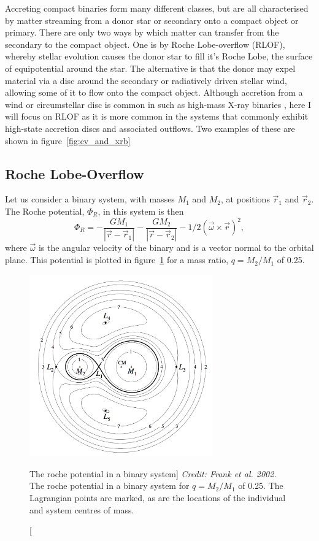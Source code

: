 Accreting compact binaries form many different classes, 
but are all characterised by matter streaming from a donor star or secondary
onto a compact object or primary.
There are only two ways by which matter can transfer 
from the secondary to the compact object. One is by Roche Lobe-overflow (RLOF),
whereby stellar evolution causes the donor star to fill it's Roche Lobe, the surface
of equipotential around the star. The alternative is that the donor may expel
material via a disc around the secondary or radiatively driven stellar wind, 
allowing some of it to flow onto the compact object. 
Although accretion from a wind or circumstellar disc is common in 
such as high-mass X-ray binaries \citep[HMXBs; e.g.][]{bartlett2013}, here I will focus on 
RLOF as it is more common in the systems that commonly exhibit high-state accretion discs
and associated outflows. Two examples of these are shown in figure~\ref{fig:cv_and_xrb}


\subsection{Roche Lobe-Overflow}

Let us consider a binary system, with masses $M_1$ and $M_2$, at positions
$\vec{r}_1$ and $\vec{r}_2$. The Roche potential, $\Phi_R$, in this system 
is then
\begin{equation}
\Phi_R = - \frac{GM_1}{| \vec{r} - \vec{r}_1 |} - 
\frac{GM_2}{| \vec{r} - \vec{r}_2 |} - 1/2 (\vec{\omega} \times
 \vec{r})^2,
\label{eq:roche}
\end{equation} 
where $\vec{\omega}$ is the angular velocity of the binary and is a vector normal to
the orbital plane. This potential is plotted in figure~\ref{fig:roche} for a mass ratio, 
$q = M_2 / M_1$ of 0.25.

\begin{figure}
\centering
\includegraphics[width=0.7\textwidth]{figures/01-intro/roche_potential.png}
\caption
[The roche potential in a binary system]
{
{\sl Credit: Frank et al. 2002.} 
The roche potential in a binary system for $q = M_2 / M_1$ of 0.25.
The Lagrangian points are marked, as are the locations of the individual
and system centres of mass.
} 
\label{fig:roche}
\end{figure}

